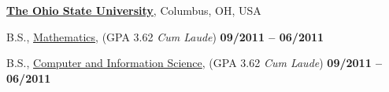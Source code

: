 \href{http://www.osu.edu/}{\textbf{The Ohio State University}},
Columbus, OH, USA
\vspace{-0.5em}
\begin{outerlist}

\item[] B.S.,
        \href{http://www.math.osu.edu/}
             {Mathematics}, (GPA 3.62 \emph{Cum Laude})
	\hfill \textbf{09/2011 -- 06/2011}
\vspace{-0.5em}
\item[] B.S.,
        \href{http://www.cse.osu.edu/}
             {Computer and Information Science}, (GPA 3.62 \emph{Cum Laude})
             \hfill \textbf{09/2011 -- 06/2011}


\end{outerlist}
